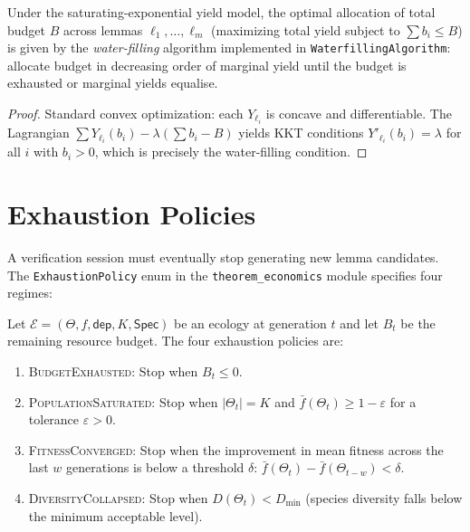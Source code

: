 \documentclass[11pt]{article}
\providecommand{\Eco}{\mathcal{E}}          %
\providecommand{\fit}{f}                    %
\providecommand{\fitbar}{\bar{f}}           %
\providecommand{\Cap}{K}                    %
\providecommand{\budget}{B}                 %
\providecommand{\dep}{\mathsf{dep}}         %
\providecommand{\Spc}{\mathsf{Spec}}        %
\begin{document}
\begin{proposition}\label{prop:waterfilling}
Under the saturating-exponential yield model, the optimal allocation
of total budget $\budget$ across lemmas $\ell_1, \ldots, \ell_m$
(maximizing total yield subject to $\sum b_i \leq \budget$) is given
by the \emph{water-filling} algorithm implemented in
\texttt{WaterfillingAlgorithm}: allocate budget in decreasing order
of marginal yield until the budget is exhausted or marginal yields
equalise.
\end{proposition}
\begin{proof}
Standard convex optimization: each $Y_{\ell_i}$ is concave and
differentiable.  The Lagrangian $\sum Y_{\ell_i}(b_i) - \lambda(\sum
b_i - \budget)$ yields KKT conditions $Y'_{\ell_i}(b_i) = \lambda$
for all $i$ with $b_i > 0$, which is precisely the water-filling
condition.
\end{proof}

\section{Exhaustion Policies}\label{sec:exhaustion}

A verification session must eventually stop generating new lemma
candidates.  The \texttt{ExhaustionPolicy} enum in the
\texttt{theorem\_economics} module specifies four regimes:

\begin{definition}\label{def:exh}
Let $\Eco = (\Theta, \fit, \dep, \Cap, \Spc)$ be an ecology at
generation $t$ and let $\budget_t$ be the remaining resource budget.
The four exhaustion policies are:

\begin{enumerate}[leftmargin=1.5em]
  \item \textsc{BudgetExhausted}: Stop when $\budget_t \leq 0$.
  \item \textsc{PopulationSaturated}: Stop when $|\Theta_t| = \Cap$
    and $\fitbar(\Theta_t) \geq 1 - \varepsilon$ for a tolerance
    $\varepsilon > 0$.
  \item \textsc{FitnessConverged}: Stop when the improvement in mean
    fitness across the last $w$ generations is below a threshold
    $\delta$:
    $\fitbar(\Theta_t) - \fitbar(\Theta_{t-w}) < \delta$.
  \item \textsc{DiversityCollapsed}: Stop when $D(\Theta_t) < D_{\min}$
    (species diversity falls below the minimum acceptable level).
\end{enumerate}
\end{definition}
\end{document}
